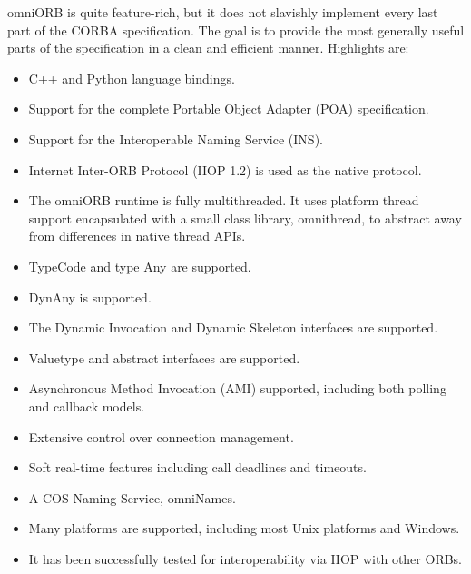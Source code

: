 \documentclass[11pt,oneside,a4paper]{book}
\begin{document}
omniORB is quite feature-rich, but it does not slavishly implement
every last part of the CORBA specification. The goal is to provide the
most generally useful parts of the specification in a clean and
efficient manner. Highlights are:

\begin{itemize}

\item C++ and Python language bindings.

\item Support for the complete Portable Object Adapter (POA) specification.

\item Support for the Interoperable Naming Service (INS).

\item Internet Inter-ORB Protocol (IIOP 1.2) is used as the native
  protocol.

\item The omniORB runtime is fully multithreaded. It uses platform
  thread support encapsulated with a small class library, omnithread,
  to abstract away from differences in native thread APIs.

\item TypeCode and type Any are supported.

\item DynAny is supported.

\item The Dynamic Invocation and Dynamic Skeleton interfaces are supported.

\item Valuetype and abstract interfaces are supported.

\item Asynchronous Method Invocation (AMI) supported, including both
  polling and callback models.

\item Extensive control over connection management.

\item Soft real-time features including call deadlines and timeouts.

\item A COS Naming Service, omniNames.

\item Many platforms are supported, including most Unix platforms and
  Windows.

\item It has been successfully tested for interoperability via IIOP with
  other ORBs.

\end{itemize}
\end{document}
